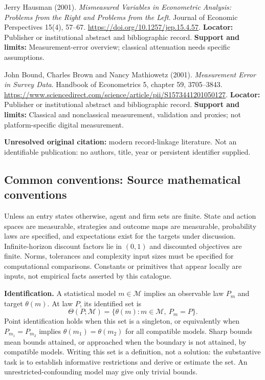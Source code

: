 \documentclass[11pt,a4paper]{article}
\begin{document}
\begin{enumerate}[label={[\textnormal{S}\arabic*]},leftmargin=*]

\item Jerry Hausman (2001). \emph{Mismeasured Variables in Econometric Analysis: Problems from the Right and Problems from the Left}. Journal of Economic Perspectives 15(4), 57–67. \url{https://doi.org/10.1257/jep.15.4.57}. \textbf{Locator:} Publisher or institutional abstract and bibliographic record. \textbf{Support and limits:} Measurement-error overview; classical attenuation needs specific assumptions.

\item John Bound, Charles Brown and Nancy Mathiowetz (2001). \emph{Measurement Error in Survey Data}. Handbook of Econometrics 5, chapter 59, 3705–3843. \url{https://www.sciencedirect.com/science/article/pii/S1573441201050127}. \textbf{Locator:} Publisher or institutional abstract and bibliographic record. \textbf{Support and limits:} Classical and nonclassical measurement, validation and proxies; not platform-specific digital measurement.

\item \textbf{Unresolved original citation:} modern record-linkage literature. Not an identifiable publication: no authors, title, year or persistent identifier supplied.

\end{enumerate}

\subsection*{Common conventions: Source mathematical conventions}

Unless an entry states otherwise, agent and firm sets are finite. State and action spaces are measurable, strategies and outcome maps are measurable, probability laws are specified, and expectations exist for the targets under discussion. Infinite-horizon discount factors lie in $(0,1)$ and discounted objectives are finite. Norms, tolerances and complexity input sizes must be specified for computational comparisons. Constants or primitives that appear locally are inputs, not empirical facts asserted by this catalogue.

\textbf{Identification.} A statistical model $m\in\mathcal M$ implies an observable law $P_m$ and target $\theta(m)$. At law $P$, its identified set is
\[
\Theta(P;\mathcal M)=\{\theta(m):m\in\mathcal M,\ P_m=P\}.
\]
Point identification holds when this set is a singleton, or equivalently when $P_{m_1}=P_{m_2}$ implies $\theta(m_1)=\theta(m_2)$ for all compatible models. Sharp bounds mean bounds attained, or approached when the boundary is not attained, by compatible models. Writing this set is a definition, not a solution: the substantive task is to establish informative restrictions and derive or estimate the set. An unrestricted-confounding model may give only trivial bounds.
\end{document}
